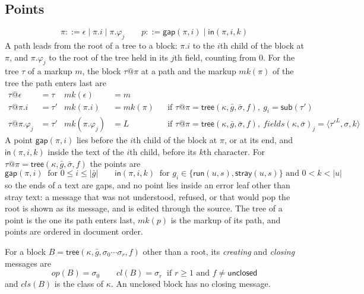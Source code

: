 \documentclass[11pt]{article}
\numberwithin{equation}{section}
\newcommand{\kw}[1]{\ensuremath{\mathsf{#1}}}
\begin{document}
\subsection{Points}
\label{sec:points}

\begin{equation}\label{eq:points}
\pi ::= \epsilon \mid \pi.i \mid \pi.\varphi_j
\qquad
p ::= \kw{gap}(\pi, i) \mid \kw{in}(\pi, i, k)
\end{equation}
A path leads from the root of a tree to a block: $\pi.i$ to the $i$th child
of the block at $\pi$, and $\pi.\varphi_j$ to the root of the tree held in
its $j$th field, counting from $0$.  For the tree $\tau$ of a markup $m$,
the block $\tau@\pi$ at a path and the markup $\mathit{mk}(\pi)$ of the
tree the path enters last are
\begin{equation}\label{eq:path}
\begin{aligned}
\tau@\epsilon &= \tau & \mathit{mk}(\epsilon) &= m \\
\tau@\pi.i &= \tau' & \mathit{mk}(\pi.i) &= \mathit{mk}(\pi)
  &&\text{if } \tau@\pi = \kw{tree}(\kappa, \bar g, \bar\sigma, f),\
    g_i = \kw{sub}(\tau') \\
\tau@\pi.\varphi_j &= \tau' & \mathit{mk}(\pi.\varphi_j) &= L
  &&\text{if } \tau@\pi = \kw{tree}(\kappa, \bar g, \bar\sigma, f),\
    \mathit{fields}(\kappa, \bar\sigma)_j = \langle \tau'^{L}, \sigma, k
    \rangle
\end{aligned}
\end{equation}
A point $\kw{gap}(\pi, i)$ lies before the $i$th child of the block at
$\pi$, or at its end, and $\kw{in}(\pi, i, k)$ inside the text of the $i$th
child, before its $k$th character.  For $\tau@\pi = \kw{tree}(\kappa, \bar
g, \bar\sigma, f)$ the points are
\begin{equation}\label{eq:point-ok}
\kw{gap}(\pi, i) \ \text{ for } 0 \le i \le |\bar g|
\qquad
\kw{in}(\pi, i, k) \ \text{ for } g_i \in \{\kw{run}(u, s),
  \kw{stray}(u, s)\} \text{ and } 0 < k < |u|
\end{equation}
so the ends of a text are gaps, and no point lies inside an error leaf
other than stray text: a message that was not understood, refused, or that
would pop the root is shown as its message, and is edited through the
source.  The tree of a point is the one its path enters last,
$\mathit{mk}(p)$ is the markup of its path, and points are ordered in
document order.

For a block $B = \kw{tree}(\kappa, \bar g, \sigma_0 \cdots \sigma_r, f)$
other than a root, its \emph{creating} and \emph{closing} messages are
\begin{equation}\label{eq:op-cl}
\mathit{op}(B) = \sigma_0
\qquad
\mathit{cl}(B) = \sigma_r \ \text{ if } r \ge 1 \text{ and } f \neq
  \kw{unclosed}
\end{equation}
and $\mathit{cls}(B)$ is the class of $\kappa$.  An unclosed block has no
closing message.
\end{document}

